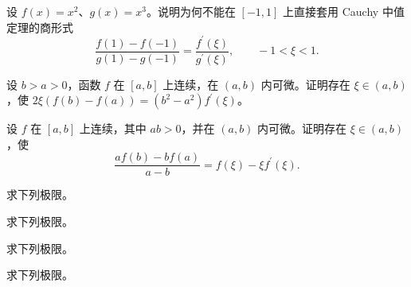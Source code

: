 \noindent\begin{minipage}{\textwidth}
设 $f(x)=x^2$、$g(x)=x^3$。说明为何不能在 $[-1,1]$ 上直接套用 Cauchy 中值定理的商形式\[\frac{f(1)-f(-1)}{g(1)-g(-1)}=\frac{f^{\prime}(\xi)}{g^{\prime}(\xi)},\qquad -1<\xi<1.\]
\end{minipage}\par\vfill
\noindent\begin{minipage}{\textwidth}
设 $b>a>0$，函数 $f$ 在 $[a,b]$ 上连续，在 $(a,b)$ 内可微。证明存在 $\xi\in(a,b)$，使 $2\xi(f(b)-f(a))=(b^2-a^2)f^{\prime}(\xi)$。
\end{minipage}\par\vfill
\noindent\begin{minipage}{\textwidth}
设 $f$ 在 $[a,b]$ 上连续，其中 $ab>0$，并在 $(a,b)$ 内可微。证明存在 $\xi\in(a,b)$，使\[\frac{af(b)-bf(a)}{a-b}=f(\xi)-\xi f^{\prime}(\xi).\]
\end{minipage}\par\vfill
\newpage
\noindent\begin{minipage}{\textwidth}
求下列极限。
\end{minipage}\par\vfill
\noindent\begin{minipage}{\textwidth}
求下列极限。
\end{minipage}\par\vfill
\noindent\begin{minipage}{\textwidth}
求下列极限。
\end{minipage}\par\vfill
\noindent\begin{minipage}{\textwidth}
求下列极限。
\end{minipage}\par\vfill
